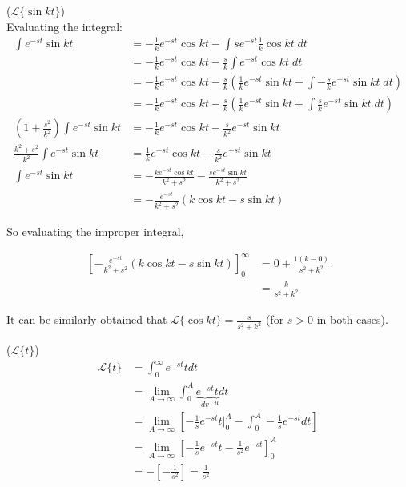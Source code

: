 \begin{definition}($\mathcal{L}\{\sin kt\}$)\\
    Evaluating the integral:
    \begin{align*}
        \int e^{-st}\sin kt&=-\frac{1}{k}e^{-st}\cos kt-\int se^{-st}\frac{1}{k}\cos kt \;dt\\
        &=-\frac{1}{k}e^{-st}\cos kt-\frac{s}{k}\int e^{-st}\cos kt \;dt\\
        &=-\frac{1}{k}e^{-st}\cos kt-\frac{s}{k}\left( \frac{1}{k}e^{-st}\sin kt-\int -\frac{s}{k}e^{-st}\sin kt\;dt \right)\\
        &=-\frac{1}{k}e^{-st}\cos kt-\frac{s}{k}\left(\frac{1}{k}e^{-st}\sin kt + \int \frac{s}{k}e^{-st}\sin kt\;dt\right)\\
        (1+\frac{s^2}{k^2})\int e^{-st}\sin kt&=-\frac{1}{k}e^{-st}\cos kt-\frac{s}{k^2}e^{-st}\sin kt\\
        \frac{k^2+s^2}{k^2}\int e^{-st}\sin kt&=\frac{1}{k}e^{-st}\cos kt-\frac{s}{k^2}e^{-st}\sin kt\\
        \int e^{-st}\sin kt&=-\frac{ke^{-st}\cos kt}{k^2+s^2}-\frac{se^{-st}\sin kt}{k^2+s^2}\\
        &=-\frac{e^{-st}}{k^2+s^2}\left(k\cos kt-s\sin kt\right)
    \end{align*}

    So evaluating the improper integral,
    
    \begin{align*}
        \left[-\frac{e^{-st}}{k^2+s^2}\left(k\cos kt-s\sin kt\right)\right]_0^\infty&=0+\frac{1(k-0)}{s^2+k^2}\\
        &=\frac{k}{s^2+k^2}
    \end{align*}

    It can be similarly obtained that $\mathcal{L}\{\cos kt\}=\frac{s}{s^2+k^2}$ (for $s>0$ in both cases).
\end{definition}

\begin{definition}($\mathcal{L}\{t\}$)
    \begin{align*}
        \mathcal{L}\{t\}&=\int_0^\infty e^{-st}tdt\\
        &=\lim_{A\to\infty}\int_0^A\underbrace{e^{-st}}_{dv}\underbrace{t}_{u}dt\\
        &=\lim_{A\to\infty}\left[ -\frac{1}{s}e^{-st}t\bigg\rvert_0^A-\int_0^A -\frac{1}{s}e^{-st}dt \right]\\
        &=\lim_{A\to\infty}\left[-\frac{1}{s}e^{-st}t-\frac{1}{s^2}e^{-st}\right]_0^A\\
        &=-\left[-\frac{1}{s^2}\right]=\frac{1}{s^2}
    \end{align*}
\end{definition}

